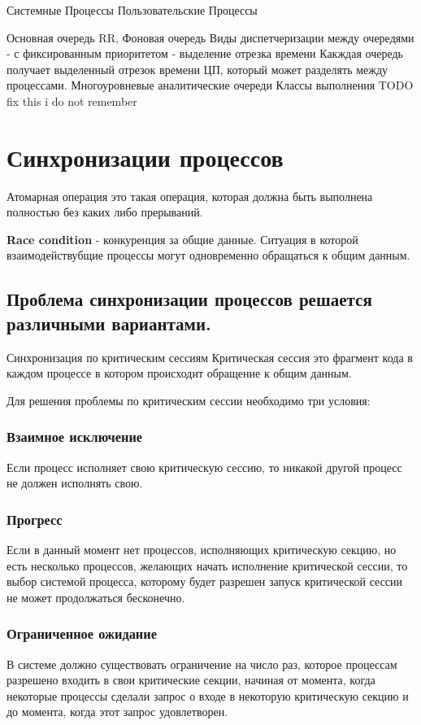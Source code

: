 \documentclass[a4paper]{article}
\begin{document}
\begin{enumerate}
    Системные Процессы
    Пользовательские Процессы
\end{enumerate}

Основная очередь RR, Фоновая очередь
Виды диспетчеризации между очередями
- с фиксированным приоритетом
- выделение отрезка времени
Какждая очередь получает выделенный отрезок времени ЦП, который может разделять между процессами.
Многоуровневые аналитические очереди
Классы выполнения
TODO fix this i do not remember
    
\section{Синхронизации процессов}
Атомарная операция это такая операция, которая должна быть выполнена полностью без каких либо прерываний.

\textbf{Race condition} - конкуренция за общие данные. Ситуация в которой взаимодействубщие процессы могут одновременно обращаться к общим данным.

\subsection{Проблема синхронизации процессов решается различными вариантами.}

Синхронизация по критическим сессиям
Критическая сессия это фрагмент кода в каждом процессе в котором происходит обращение к общим данным.

Для решения проблемы по критическим сессии необходимо три условия:

\subsubsection{Взаимное исключение}
Если процесс исполняет свою критическую сессию, то никакой другой процесс не должен исполнять свою.

\subsubsection{Прогресс}
Если в данный момент нет процессов, исполняющих критическую секцию, но есть несколько процессов, желающих начать исполнение критической сессии, то выбор системой процесса, которому будет разрешен запуск критической сессии не может продолжаться бесконечно.

\subsubsection{Ограниченное ожидание}
В системе должно существовать ограничение на число раз, которое процессам разрешено входить в свои критические секции, начиная от момента, когда некоторые процессы сделали запрос о входе в некоторую критическую  секцию и до момента, когда этот запрос удовлетворен.
\end{document}

